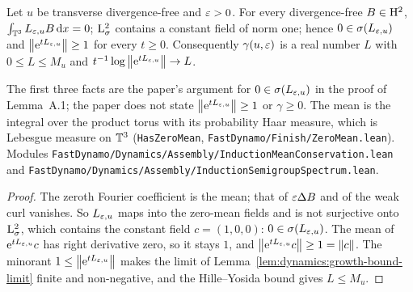 \begin{lemma}
  \label{lem:dynamics:mean-conservation}
  \leanok
  Let $u$ be transverse divergence-free and $\varepsilon>0$.  For every divergence-free
  $B\in\mathrm{H}^2$, $\int_{\mathbb{T}^3}L_{\varepsilon,u}B\,\mathrm{d} x=0$; $\mathrm{L}^2_\sigma$ contains a constant field of norm
  one; hence $0\in\sigma(L_{\varepsilon,u})$ and $\left\|\mathrm{e}^{tL_{\varepsilon,u}}\right\|\geq1$ for every $t\geq0$.
  Consequently $\gamma(u,\varepsilon)$ is a real number $L$ with
  $0\leq L\leq M_u$ and $t^{-1}\log\left\|\mathrm{e}^{tL_{\varepsilon,u}}\right\|\to L$.
\end{lemma}

The first three facts are the paper's argument for $0\in\sigma(L_{\varepsilon,u})$ in the proof of
Lemma~A.1; the paper does not state $\left\|\mathrm{e}^{tL_{\varepsilon,u}}\right\|\geq1$ or $\gamma\geq0$.  The mean
is the integral over the product torus with its probability Haar measure, which is Lebesgue
measure on $\mathbb{T}^3$ (\texttt{HasZeroMean}, \texttt{FastDynamo/Finish/ZeroMean.lean}).  Modules
\texttt{FastDynamo/Dynamics/Assembly/InductionMeanConservation.lean} and
\texttt{FastDynamo/Dynamics/Assembly/InductionSemigroupSpectrum.lean}.

\begin{proof}
  \leanok
  The zeroth Fourier coefficient is the mean; that of $\varepsilon\Delta B$ and of the weak curl
  vanishes.  So $L_{\varepsilon,u}$ maps into the zero-mean fields and is not surjective onto
  $\mathrm{L}^2_\sigma$, which contains the constant field $c=(1,0,0)$: $0\in\sigma(L_{\varepsilon,u})$.
  The mean of $\mathrm{e}^{tL_{\varepsilon,u}}c$ has right derivative zero, so it stays $1$, and
  $\left\|\mathrm{e}^{tL_{\varepsilon,u}}c\right\|\geq1=\left\|c\right\|$.  The minorant $1\leq\left\|\mathrm{e}^{tL_{\varepsilon,u}}\right\|$ makes
  the limit of Lemma~\ref{lem:dynamics:growth-bound-limit} finite and non-negative, and the
  Hille--Yosida bound gives $L\leq M_u$.
\end{proof}

